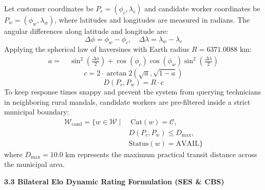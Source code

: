 \documentclass[10pt,twocolumn,a4paper]{article}
\begin{document}
Let customer coordinates be $P_c = (\phi_c, \lambda_c)$ and candidate worker coordinates be $P_w = (\phi_w, \lambda_w)$, where latitudes and longitudes are measured in radians. The angular differences along latitude and longitude are:
\begin{equation}
\Delta\phi = \phi_w - \phi_c, \quad \Delta\lambda = \lambda_w - \lambda_c
\end{equation}
Applying the spherical law of haversines with Earth radius $R = 6371.0088\text{ km}$:
\begin{equation}
\begin{aligned}
a = &\; \sin^2\left(\frac{\Delta\phi}{2}\right) + \cos(\phi_c)\cos(\phi_w)\sin^2\left(\frac{\Delta\lambda}{2}\right)
\end{aligned}
\end{equation}
\begin{equation}
c = 2 \cdot \arctan2\left(\sqrt{a}, \sqrt{1 - a}\right)
\end{equation}
\begin{equation}
D(P_c, P_w) = R \cdot c
\end{equation}
To keep response times snappy and prevent the system from querying technicians in neighboring rural mandals, candidate workers are pre-filtered inside a strict municipal boundary:
\begin{equation}
\begin{aligned}
\mathcal{W}_{\text{cand}} = \{ w \in \mathcal{W} \mid &\; \text{Cat}(w) = \mathcal{C}, \\
& D(P_c, P_w) \le D_{\max}, \\
& \text{Status}(w) = \text{AVAIL} \}
\end{aligned}
\end{equation}
where $D_{\max} = 10.0\text{ km}$ represents the maximum practical transit distance across the municipal area.

\vspace{0.35em}
\noindent
\textbf{3.3 Bilateral Elo Dynamic Rating Formulation (SES \& CBS)}
\end{document}
